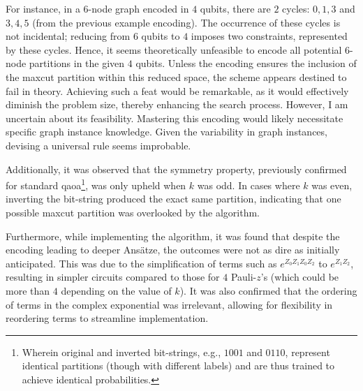 For instance, in a $6$-node graph encoded in $4$ qubits, there are $2$ cycles: $0, 1, 3$ and $3, 4, 5$ (from the previous example encoding). The occurrence of these cycles is not incidental; reducing from $6$ qubits to $4$ imposes two constraints, represented by these cycles. Hence, it seems theoretically unfeasible to encode all potential $6$-node partitions in the given $4$ qubits. Unless the encoding ensures the inclusion of the \acrshort{maxcut} partition within this reduced space, the scheme appears destined to fail in theory. Achieving such a feat would be remarkable, as it would effectively diminish the problem size, thereby enhancing the search process. However, I am uncertain about its feasibility. Mastering this encoding would likely necessitate specific graph instance knowledge. Given the variability in graph instances, devising a universal rule seems improbable.

Additionally, it was observed that the symmetry property, previously confirmed for standard \acrshort{qaoa}\footnote{Wherein original and inverted bit-strings, e.g., $1001$ and $0110$, represent identical partitions (though with different labels) and are thus trained to achieve identical probabilities.}, was only upheld when $k$ was odd. In cases where $k$ was even, inverting the bit-string produced the exact same partition, indicating that one possible \acrshort{maxcut} partition was overlooked by the algorithm.

Furthermore, while implementing the algorithm, it was found that despite the encoding leading to deeper Ansätze, the outcomes were not as dire as initially anticipated. This was due to the simplification of terms such as $e^{Z_0Z_1Z_0Z_2}$ to $e^{Z_1Z_2}$, resulting in simpler circuits compared to those for $4$ Pauli-$z$'s (which could be more than $4$ depending on the value of $k$). It was also confirmed that the ordering of terms in the complex exponential was irrelevant, allowing for flexibility in reordering terms to streamline implementation.

